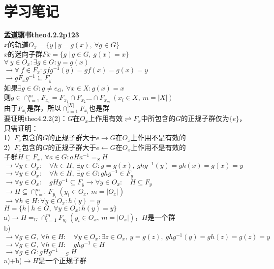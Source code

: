 \section{学习笔记}

\noindent\textbf{孟道骥书\cite{meng2010}theo4.2.2p123}\\

\noindent $x$的轨道$O_{x}=\{y\ |\ y=g(x),\ \forall g\in G\}$\\
$x$的迷向子群$Fx=\{g\ |\ g\in G,\ g(x)=x\}$\\

\noindent$\forall\ y \in O_{x}:\exists g\in G:y=g(x)$\\
$\rightarrow \forall\ f\in F_{x}:gfg^{-1}(y)=gf(x)=g(x)=y$\\
$\rightarrow gF_{x}g^{-1}\subseteq F_{y}$\\

\noindent 如果$\exists g\in G:g\neq e_{G},\ \forall x\in X:g(x)=x$\\
则$g\in \cap_{i=1}^{m} F_{x_{i}}= F_{x_{1}}\cap F_{x_{2}}...\cap F_{x_{m}} \ (x_{i}\in X,\ m=|X|)$\\
由于$F_{x_{i}}$是群，所以$\cap_{i=1}^{|X|} F_{x_{i}}$也是群\\

\noindent 要证明theo4.2.2(2)：$G$在$O_{x}$上作用有效$\rightleftharpoons$$F_{x}$中所包含的$G$的正规子群仅为$\{e\}$，只需证明：\\
1）$F_{x}$包含的$G$的正规子群大于${e}$$\rightarrow$$G$在$O_{x}$上作用不是有效的\\
2）$F_{x}$包含的$G$的正规子群大于${e}$$\leftarrow$$G$在$O_{x}$上作用不是有效的\\

\noindent 子群$H\subseteq F_{x},\ \forall a\in G:aHa^{-1}=_{S}H$\\
$\rightarrow \forall y\in O_{x}:\quad \forall h\in H,\ \exists g\in G:y=g(x),\ ghg^{-1}(y)=gh(x)=g(x)=y$\\
$\rightarrow \forall y\in O_{x}:\quad \forall h\in H,\ \exists g\in G:ghg^{-1}\in F_{y}$\\
$\rightarrow \forall y\in O_{x}:\quad gHg^{-1}\subseteq F_{y}\rightarrow \forall y\in O_{x}:\quad H\subseteq F_{y}$\\
$\rightarrow H\subseteq \cap_{i=1}^{m} F_{y_{i}}\ (y_{i}\in O_{x},\ m=|O_{x}|)$\\
$\rightarrow \forall h\in H:\forall y\in O_{x}:h(y)=y$\\

\noindent $H=\{h\ |\ h\in G,\ \forall y\in O_{x}:h(y)=y\}$\\
a)$\rightarrow H=_{G}\cap_{i=1}^{m} F_{y_{i}}\ (y_{i}\in O_{x},\ m=|O_{x}|)$，$H$是一个群\\
b)$\rightarrow\forall g\in G,\ \forall h\in H:\quad\forall y\in O_{x}:\exists z\in O_{x},\ y=g(z),\ ghg^{-1}(y)=gh(z)=g(z)=y$\\
$\rightarrow\forall g\in G,\ \forall h\in H:\quad ghg^{-1}\in H$\\
$\rightarrow\forall g\in G:gHg^{-1}=_{S}H$\\
a)+b)$\rightarrow H$是一个正规子群\\
